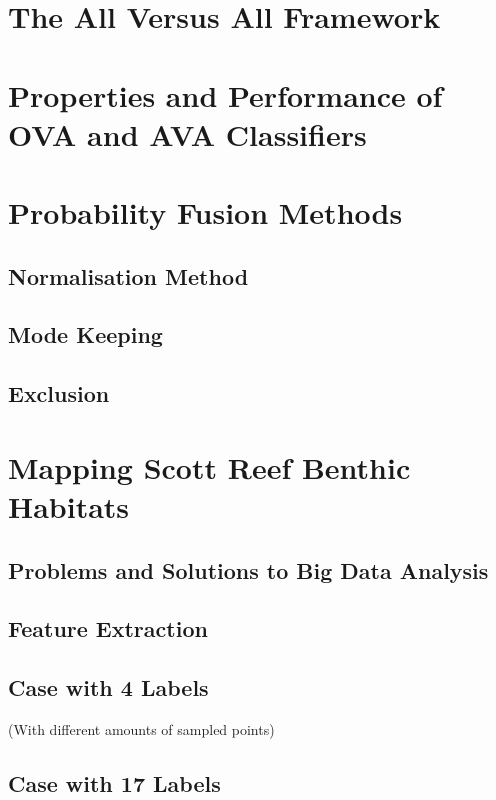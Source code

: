 	\section{The All Versus All Framework}
	
	\section{Properties and Performance of OVA and AVA Classifiers}
	
	\section{Probability Fusion Methods}
	
		\subsection{Normalisation Method}
			
		\subsection{Mode Keeping}
			
		\subsection{Exclusion}
			
	\section{Mapping Scott Reef Benthic Habitats}
	
		\subsection{Problems and Solutions to Big Data Analysis}
		
		\subsection{Feature Extraction}
		
		\subsection{Case with 4 Labels}
		
			(With different amounts of sampled points)
			
		\subsection{Case with 17 Labels}
		